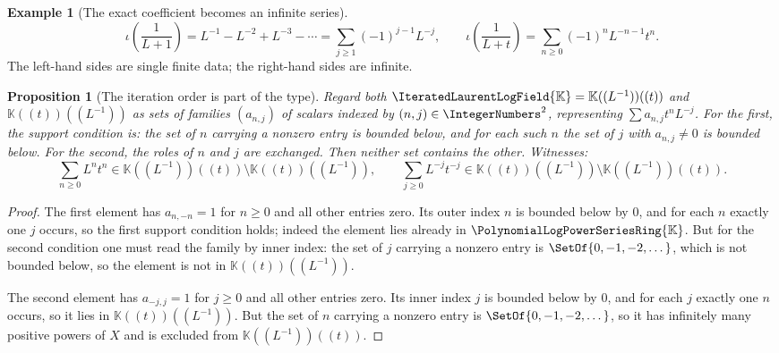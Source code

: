 \documentclass[11pt,oneside]{article}
\theoremstyle{plain}
\newtheorem{proposition}[theorem]{Proposition}
\theoremstyle{definition}
\newtheorem{example}[theorem]{Example}
\theoremstyle{remark}
\newcommand{\K}{\mathbb{K}}
\newcommand{\PLpow}{\PolynomialLogPowerSeriesRing{\K}}   %
\newcommand{\PLit}{\IteratedLaurentLogField{\K}}         %
\begin{document}
\begin{example}[The exact coefficient becomes an infinite series]
\label{plt:ex:div-embedding}
\begin{equation}\label{plt:eq:div-embedding-example}
  \iota\!\left(\frac1{L+1}\right)
  =L^{-1}-L^{-2}+L^{-3}-\cdots
  =\sum_{j\ge1}(-1)^{j-1}L^{-j},
  \qquad
  \iota\!\left(\frac1{L+t}\right)
  =\sum_{n\ge0}(-1)^{n}L^{-n-1}t^{n}.
\end{equation}
The left-hand sides are single finite data; the right-hand sides are infinite.
\end{example}

\begin{proposition}[The iteration order is part of the type]
\label{plt:prop:div-iteration-order}
Regard both \(\PLit=\K((L^{-1}))((t))\) and \(\K((t))((L^{-1}))\) as sets of
families \((a_{n,j})\) of scalars indexed by
\((n,j)\in\IntegerNumbers^{2}\), representing \(\sum a_{n,j}t^{n}L^{-j}\).
For the first, the support condition is: the set of \(n\) carrying a nonzero
entry is bounded below, and for each such \(n\) the set of \(j\) with
\(a_{n,j}\ne0\) is bounded below.  For the second, the roles of \(n\) and
\(j\) are exchanged.  Then neither set contains the other.  Witnesses:
\begin{equation}\label{plt:eq:div-iteration-order}
  \sum_{n\ge0}L^{n}t^{n}\in\K((L^{-1}))((t))\setminus\K((t))((L^{-1})),
  \qquad
  \sum_{j\ge0}L^{-j}t^{-j}\in\K((t))((L^{-1}))\setminus\K((L^{-1}))((t)).
\end{equation}
\end{proposition}

\begin{proof}
The first element has \(a_{n,-n}=1\) for \(n\ge0\) and all other entries zero.
Its outer index \(n\) is bounded below by \(0\), and for each \(n\) exactly one
\(j\) occurs, so the first support condition holds; indeed the element lies
already in \(\PLpow\).  But for the second condition one must read the family
by inner index: the set of \(j\) carrying a nonzero entry is
\(\SetOf{0,-1,-2,\dots}\), which is not bounded below, so the element is not in
\(\K((t))((L^{-1}))\).

The second element has \(a_{-j,j}=1\) for \(j\ge0\) and all other entries zero.
Its inner index \(j\) is bounded below by \(0\), and for each \(j\) exactly one
\(n\) occurs, so it lies in \(\K((t))((L^{-1}))\).  But the set of \(n\)
carrying a nonzero entry is \(\SetOf{0,-1,-2,\dots}\), so it has infinitely
many positive powers of \(X\) and is excluded from \(\K((L^{-1}))((t))\).
\end{proof}
\end{document}
